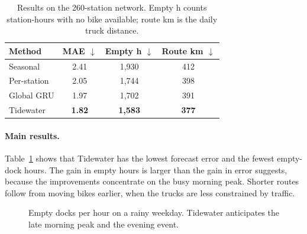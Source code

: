 \documentclass[10pt,twocolumn,letterpaper]{article}
\begin{document}
\begin{table}[t]
  \centering
  \small
  \begin{tabular}{lccc}
    \toprule
    Method & MAE $\downarrow$ & Empty h $\downarrow$ & Route km $\downarrow$ \\
    \midrule
    Seasonal       & 2.41 & 1{,}930 & 412 \\
    Per-station    & 2.05 & 1{,}744 & 398 \\
    Global GRU     & 1.97 & 1{,}702 & 391 \\
    Tidewater      & \textbf{1.82} & \textbf{1{,}583} & \textbf{377} \\
    \bottomrule
  \end{tabular}
  \caption{Results on the 260-station network. Empty h counts station-hours with no bike available; route km is the daily truck distance.}
  \label{tab:main}
\end{table}

\paragraph{Main results.}
Table~\ref{tab:main} shows that Tidewater has the lowest forecast error and the fewest empty-dock hours.
The gain in empty hours is larger than the gain in error suggests, because the improvements concentrate on the busy morning peak.
Shorter routes follow from moving bikes earlier, when the trucks are less constrained by traffic.

\begin{figure}[t]
  \centering
  \caption{Empty docks per hour on a rainy weekday. Tidewater anticipates the late morning peak and the evening event.}
  \label{fig:hourly}
\end{figure}
\end{document}
